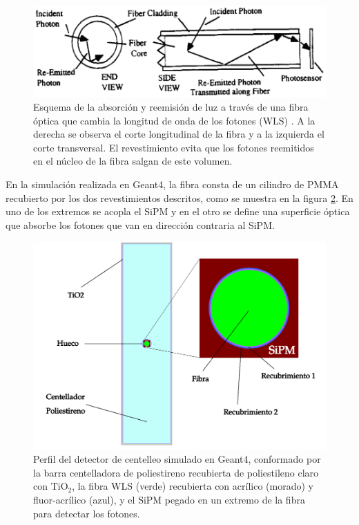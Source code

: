 \documentclass[12pt,oneside,openany,letter]{book}
\begin{document}
\begin{figure}[h!]
    \centering        \includegraphics[scale=0.5]{images/fiber_cladding.png}
   \caption[Esquema de la absorción y reemisión de luz a través de una fibra óptica]{Esquema de la absorción y reemisión de luz a través de una fibra óptica que cambia la longitud de onda de los fotones (WLS) \cite{Worstell-etal1994}. A la derecha se observa el corte longitudinal de la fibra y a la izquierda el corte transversal. El revestimiento evita que los fotones reemitidos en el n\'ucleo de la fibra salgan de este volumen.}\label{fiber_cladding}
\end{figure}


En la simulaci\'on realizada en Geant4, la fibra consta de un cilindro de PMMA recubierto por los dos revestimientos descritos, como se muestra en la figura \ref{perfil_sipm}. En uno de los extremos se acopla el SiPM y en el otro se define una superficie óptica que absorbe los fotones que van en dirección contraria al SiPM. 

\begin{figure}[h!]
    \centering        \includegraphics[scale=0.35]{images/perfil_sipm.png}
   \caption[Perfil del detector de centelleo simulado en GEANT4]{Perfil del detector de centelleo simulado en Geant4, conformado por la barra centelladora de poliestireno recubierta de poliestileno claro con $\text{TiO}_{2}$, la fibra WLS (verde) recubierta con acrílico (morado) y fluor-acrílico (azul), y el SiPM pegado en un extremo de la fibra para detectar los fotones.}\label{perfil_sipm}
\end{figure}
\end{document}

